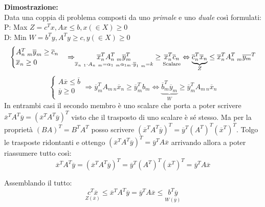 \documentclass{article}
\begin{document}
\begin{tcolorbox}[
    colback=lightgray,
    colframe=black,
    coltext=black,
    title=Dimostrazione,
    colbacktitle=black,
    coltitle=lightgray,
    breakable
  ]
  \textbf{Dimostrazione:}\\
  Data una coppia  di problema composti da uno \textit{primale} e uno \textit{duale} così formulati:\\
  \hspace{3cm}P: Max $Z=c^Tx, Ax \le b, x (\in X) \ge 0$\\
  \hspace{3cm}D: Min $W=b^Ty, A^Ty\ge c, y(\in X) \ge 0$\\
  $$
    \begin{cases}
      A^T_{n \ m}\overline{y}_m \ge \overline{c}_n \\
      \overline{x}_n \ge 0                         \\
    \end{cases}
    {\Rightarrow} \underset{\overline{x}_{n\ 1}\cdot A_{n\ m} = \alpha_{1\ m} \\ \alpha_{1 m}\cdot \overline{y}_{1\ m} = k}{\overline{x}_n^TA^T_{n\ m}\overline{y}^T_m} \ge \underset{\text{Scalare}}{\overline{x}_n^T\overline{c}_n} \Leftrightarrow \underbrace{\overline{c}_n^T\overline{x}_n}_{Z} \le \overline{x}_n^TA_{n\ m}^T\overline{y_m}^T
  $$
  $$
    \begin{cases}
      A\overline{x} \le \overline{b} \\
      \overline{y}\ge 0              \\
    \end{cases}
    {\Rightarrow} \overline{y}_m^TA_{m\ n}\overline{x}_n \ge \overline{y}_m^Tb_m \Leftrightarrow \underbrace{\overline{b}_m^T\overline{y}_m}_{W} \ge \overline{y}_m^TA_{m\ n}\overline{x}_n
  $$
  In entrambi casi il secondo membro è uno scalare che porta a poter scrivere $\overline{x}^TA^T\overline{y}=(\overline{x}^TA^T\overline{y})^T$ visto che il trasposto di uno scalare è sé stesso. Ma per la proprietà $(BA)^T=B^TA^T$ posso scrivere $(\overline{x}^TA^T\overline{y})^T=\overline{y}^T (A^T)^T (\overline{x}^T)^T$. Tolgo le trasposte ridontanti e ottengo $(\overline{x}^TA^T\overline{y})^T=\overline{y}^TA\overline{x}$ arrivando allora a poter riassumere tutto così:
  $$\overline{x}^T A^T \overline{y} = (\overline{x}^T A^T \overline{y})^T = \overline{y}^T (A^T)^T (\overline{x}^T)^T = \overline{y}^T A \overline{x}$$

  Assemblando il tutto:
  $$\underset{Z(\overline{x})}{c^T \overline{x}} \leq \overline{x}^T A^T \overline{y} = \overline{y}^T A \overline{x} \leq \underset{W(\overline{y})}{b^T \overline{y}}$$
\end{tcolorbox}
\end{document}
